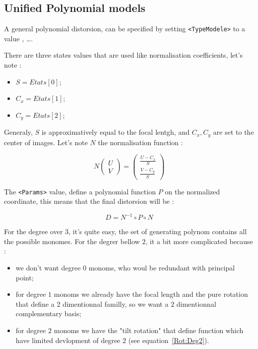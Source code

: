 
\subsection{Unified Polynomial models}

A general polynomial distorsion, can be specified by setting {\tt <TypeModele>} to a value
{\tt <eModelePolyDeg2>}, {\tt <eModelePolyDeg3>} \dots  {\tt <eModelePolyDeg7>}. 

There are three states values that are used like normalisation coefficients,
let's note :

\begin{itemize}
 \item  $S = Etats[0] $;
 \item  $C_x = Etats[1] $;
 \item  $C_y = Etats[2] $;
\end{itemize}

Generaly, $S$ is approximatively equal to the focal lentgh, and $C_x,C_y$ are
set to the center of images. Let's note $N$ the normalisation function :

\begin{equation}
   N \begin{pmatrix} U \\ V \end{pmatrix} 
   = \begin{pmatrix} \frac{U-C_x}{S} \\  \frac{V-C_y}{S} \end{pmatrix}
\end{equation}


The {\tt <Params>} value, define a polynomial function $P$ on the normalized
coordinate, this means that the final distorsion will be :


\begin{equation}
    D = N^{-1} \circ P \circ N
\end{equation}

For the degree over $3$, it's quite easy, the set of generating polynom contains
all the possible monomes. For the degrer bellow $2$, it a bit more complicated
because :

\begin{itemize}
    \item  we don't want degree $0$ monoms, who woul be redundant with principal point;
    \item  for degree $1$ monoms we already have the focal length and the pure rotation
           that define a 2 dimentionnal familly, so we want a $2$ dimentionnal complementary
           basis;
    \item  for degree $2$ monoms we have the "tilt rotation" that define  function which
           have limited devlopment of degree $2$ (see equation~\ref{Rot:Deg2}).
\end{itemize}


